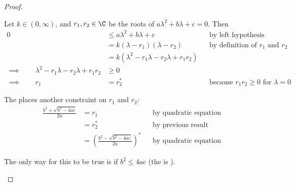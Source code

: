 \begin{proof}
\begin{enumerate}
\begin{enumerate}
                Let $k\in(0,\infty)$, and $r_1,r_2\in\C$ be the roots of
           $a\lambda^2 + b\lambda + c = 0$.
        Then
        \begin{align*}
           0
             &\le a\lambda^2 + b\lambda + c
             &&   \text{by left hypothesis}
           \\&=   k(\lambda-r_1)(\lambda-r_2)
             &&   \text{by definition of $r_1$ and $r_2$}
           \\&=   k(\lambda^2 -r_1\lambda -r_2\lambda + r_1r_2)
           \\\implies\qquad
           \lambda^2 -r_1\lambda -r_2\lambda + r_1r_2
             &\ge 0
           \\\implies\qquad
           r_1 &= r_2^\ast
             && \text{because $r_1r_2\ge0$ for $\lambda=0$}
        \end{align*}

        The  places another constraint on $r_1$ and $r_2$:
        \begin{align*}
          \frac{b^2 + \sqrt{b^2-4ac}}{2a}
            &= r_1
            && \text{by quadratic equation}
          \\&= r_2^\ast
            && \text{by previous result}
          \\&= \left(\frac{b^2 - \sqrt{b^2-4ac}}{2a}\right)^\ast
            && \text{by quadratic equation}
        \end{align*}

        The only way for this to be true is if $b^2 \le 4ac$
        (the  is ).


\end{enumerate}
\end{enumerate}
\end{proof}
